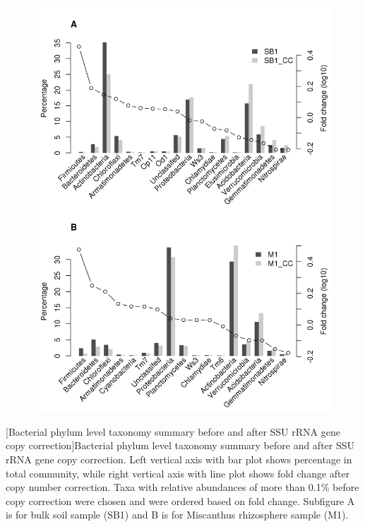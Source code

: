 \documentclass[]{msu-thesis}
\begin{document}
\begin{figure}[tbph!]
  \centering
  \includegraphics[scale=1]{figs/chap2_figS8}
\end{figure}
\clearpage
\SingleSpacing
{}[Bacterial phylum level taxonomy summary before and after SSU rRNA gene copy correction]{Bacterial phylum level taxonomy summary before and after SSU rRNA gene copy correction. Left vertical axis with bar plot shows percentage in total community, while right vertical axis with line plot shows fold change after copy number correction. Taxa with relative abundances of more than 0.1\% before copy correction were chosen and were ordered based on fold change. Subfigure A is for bulk soil sample (SB1) and B is for Miscanthus rhizosphere sample (M1).}
\label{fig:chap2FigS8}
\DoubleSpacing
\bigbreak
\end{document}
